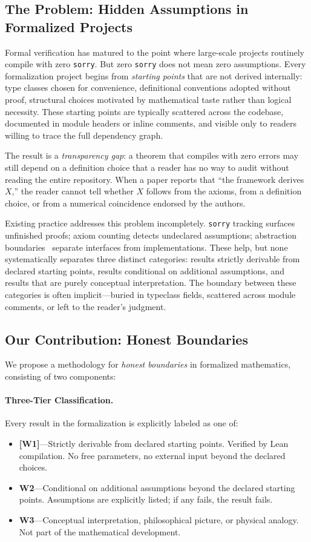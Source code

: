 ﻿\documentclass[11pt]{article}
\newcommand{\wone}[1]{\textcolor{wcolor}{\textbf{[#1]}}}
\begin{document}
\subsection{The Problem: Hidden Assumptions in Formalized Projects}
Formal verification has matured to the point where large-scale
projects routinely compile with zero \texttt{sorry}. But zero
\texttt{sorry} does not mean zero assumptions. Every
formalization project begins from \emph{starting points} that
are not derived internally: type classes chosen for
convenience, definitional conventions adopted without proof,
structural choices motivated by mathematical taste rather
than logical necessity. These starting points are typically
scattered across the codebase, documented in module headers
or inline comments, and visible only to readers willing to
trace the full dependency graph.

The result is a \emph{transparency gap}: a theorem that
compiles with zero errors may still depend on a definition
choice that a reader has no way to audit without reading
the entire repository. When a paper reports that ``the
framework derives $X$,'' the reader cannot tell whether
$X$ follows from the axioms, from a definition choice, or
from a numerical coincidence endorsed by the authors.

Existing practice addresses this problem incompletely.
\texttt{sorry} tracking surfaces unfinished proofs; axiom
counting detects undeclared assumptions; abstraction
boundaries~\cite{commelin2023} separate interfaces from
implementations. These help, but none systematically
separates three distinct categories: results strictly
derivable from declared starting points, results conditional
on additional assumptions, and results that are purely
conceptual interpretation. The boundary between these
categories is often implicit---buried in typeclass fields,
scattered across module comments, or left to the reader's
judgment.

\subsection{Our Contribution: Honest Boundaries}
We propose a methodology for \emph{honest boundaries} in
formalized mathematics, consisting of two components:

\paragraph{Three-Tier Classification.} Every result in the
formalization is explicitly labeled as one of:
\begin{itemize}
\item \wone{W1}---Strictly derivable from declared starting
  points. Verified by Lean compilation. No free parameters,
  no external input beyond the declared choices.
\item \textbf{W2}---Conditional on additional assumptions
  beyond the declared starting points. Assumptions are
  explicitly listed; if any fails, the result fails.
\item \textbf{W3}---Conceptual interpretation, philosophical
  picture, or physical analogy. Not part of the mathematical
  development.
\end{itemize}
\end{document}
